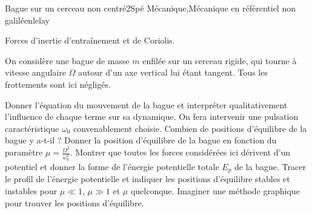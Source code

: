 
\begin{exercise}{Bague sur un cerceau non centré}{2}{Spé}
{Mécanique,Mécanique en référentiel non galiléen}{lelay}

\begin{questions}
    \questioncours Forces d'inertie d'entraînement et de Coriolis.
\begin{EnvUplevel}
On considère une bague de masse $m$ enfilée sur un cerceau rigide, qui tourne à vitesse angulaire $\Omega$ autour d'un axe vertical lui étant tangent. Tous les frottements sont ici négligés.
\end{EnvUplevel}
    \question Donner l'équation du mouvement de la bague et interpréter qualitativement l'influence de chaque terme sur sa dynamique. On fera intervenir une pulsation caractéristique $\omega_0$ convenablement choisie.
    \question Combien de positions d'équilibre de la bague y a-t-il ?
    \question Donner la position d'équilibre de la bague en fonction du paramètre $\mu = \frac{\Omega^2}{\omega_0^2}$. 
    \question Montrer que toutes les forces considérées ici dérivent d'un potentiel et donner la forme de l'énergie potentielle totale $E_p$ de la bague.
    \question Tracer le profil de l'énergie potentielle et indiquer les positions d'équilibre stables et instables pour $\mu \ll 1$, $\mu \gg 1$ et $\mu$ quelconque.
    \question Imaginer une méthode graphique pour trouver les positions d'équilibre.
\end{questions}
\end{exercise}